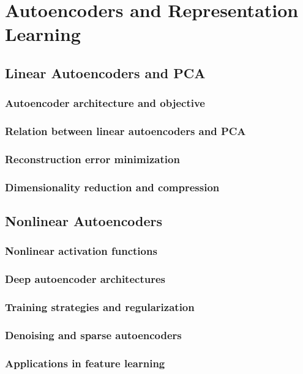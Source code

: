 ﻿\chapter{Autoencoders and Representation Learning}

\section{Linear Autoencoders and PCA}
\subsection{Autoencoder architecture and objective}
\subsection{Relation between linear autoencoders and PCA}
\subsection{Reconstruction error minimization}
\subsection{Dimensionality reduction and compression}

\section{Nonlinear Autoencoders}
\subsection{Nonlinear activation functions}
\subsection{Deep autoencoder architectures}
\subsection{Training strategies and regularization}
\subsection{Denoising and sparse autoencoders}
\subsection{Applications in feature learning}

